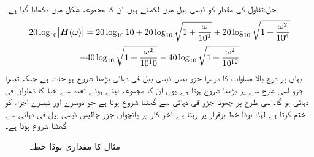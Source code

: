 حل:تفاول کی مقدار کو ڈیسی بیل میں لکھتے ہیں۔ان کا مجموعہ شکل  میں دکھایا گیا ہے۔
\begin{multline*}
20\log_{10}\abs{{{\boldsymbol{H}}}(\omega)}=20\log_{10} 10 +20\log_{10} \sqrt{1+\frac{\omega}{10^2}}+20\log_{10}\sqrt{1+\frac{\omega^2}{10^6}} \\
-40\log_{10}\sqrt{1+\frac{\omega^2}{10^10}}-40\log_{10}\sqrt{1+\frac{\omega^2}{10^{12}}}
\end{multline*}
یہاں  پر درج بالا مساوات کا دوسرا جزو بیس ڈیسی بیل فی دہائی بڑھنا شروع ہو جات ہے جبکہ تیسرا جزو اسی شرح سے  پر بڑھنا شروع ہوتا ہے۔یوں ان کا مجموعہ لیتے ہوئے  تعدد سے خط کا ڈھلوان  فی دہائی ہو گا۔اسی طرح  پر چھوتا جزو  فی دہائی سے گھٹنا شروع ہوتا ہے جو دوسرے اور تیسرے اجزاء کو ختم کرتا ہے لہٰذا بوڈا خط برقرار  پر رہتا ہے۔آخر کار  پر پانچواں جزو چالیس ڈیسی بیل فی دہائی سے گھٹنا شروع ہوتا ہے۔ 
\begin{figure}
\centering
{}
\caption{مثال  کا مقداری بوڈا خط۔}
\label{شکل_تعددی_چالیس_ڈیسی_بیل_ڈھلوان}
\end{figure}


